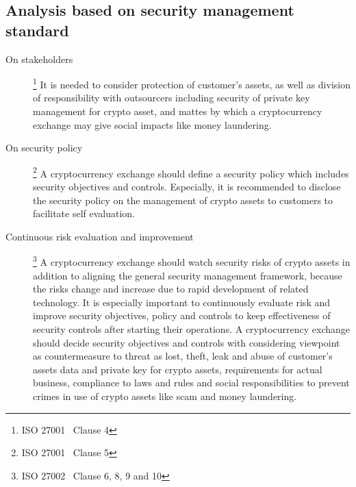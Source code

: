 \subsection{Analysis based on security management standard}

\begin{description}
 \item[On stakeholders]\footnote{ISO 27001~\cite{ISO27001} Clause 4}
       It is needed to consider protection of customer’s assets, as well as division of responsibility with outsourcers including security of private key management for crypto asset, and mattes by which a cryptocurrency exchange may give social impacts like money laundering.
 \item[On security policy]\footnote{ISO 27001~\cite{ISO27001} Clause 5}
       A cryptocurrency exchange should define a security policy which includes security objectives and controls. Especially, it is recommended to disclose the security policy on the management of crypto assets to customers to facilitate self evaluation.
 \item[Continuous risk evaluation and improvement]\footnote{ISO 27002~\cite{ISO27002} Clause 6, 8, 9 and 10}
       A cryptocurrency exchange should watch security risks of crypto assets in addition to aligning the general security management framework, because the risks change and increase due to rapid development of related technology. It is especially important to continuously evaluate risk and improve security objectives, policy and controls to keep effectiveness of security controls after starting their operations. A cryptocurrency exchange should decide security objectives and controls with considering viewpoint as countermeasure to threat as lost, theft, leak and abuse of customer’s assets data and private key for crypto assets, requirements for actual business, compliance to laws and rules and social responsibilities to prevent crimes in use of crypto assets like scam and money laundering.
\end{description}
